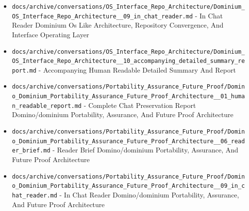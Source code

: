 \documentclass[10.5pt,a4paper,openany]{book}
\begin{document}
\begin{itemize}
\item \texttt{docs/\allowbreak{}archive/\allowbreak{}conversations/\allowbreak{}OS\_\allowbreak{}Interface\_\allowbreak{}Repo\_\allowbreak{}Architecture/\allowbreak{}Dominium\_\allowbreak{}OS\_\allowbreak{}Interface\_\allowbreak{}Repo\_\allowbreak{}Architecture\_\allowbreak{}\_\allowbreak{}09\_\allowbreak{}in\_\allowbreak{}chat\_\allowbreak{}reader.\allowbreak{}md} -\allowbreak{} In Chat Reader Dominium Os Like Architecture, Repository Convergence, And Interface Operating Layer
\item \texttt{docs/\allowbreak{}archive/\allowbreak{}conversations/\allowbreak{}OS\_\allowbreak{}Interface\_\allowbreak{}Repo\_\allowbreak{}Architecture/\allowbreak{}Dominium\_\allowbreak{}OS\_\allowbreak{}Interface\_\allowbreak{}Repo\_\allowbreak{}Architecture\_\allowbreak{}\_\allowbreak{}10\_\allowbreak{}accompanying\_\allowbreak{}detailed\_\allowbreak{}summary\_\allowbreak{}report.\allowbreak{}md} -\allowbreak{} Accompanying Human Readable Detailed Summary And Report
\item \texttt{docs/\allowbreak{}archive/\allowbreak{}conversations/\allowbreak{}Portability\_\allowbreak{}Assurance\_\allowbreak{}Future\_\allowbreak{}Proof/\allowbreak{}Domino\_\allowbreak{}Dominium\_\allowbreak{}Portability\_\allowbreak{}Assurance\_\allowbreak{}Future\_\allowbreak{}Proof\_\allowbreak{}Architecture\_\allowbreak{}\_\allowbreak{}01\_\allowbreak{}human\_\allowbreak{}readable\_\allowbreak{}report.\allowbreak{}md} -\allowbreak{} Complete Chat Preservation Report Domino/\allowbreak{}dominium Portability, Assurance, And Future Proof Architecture
\item \texttt{docs/\allowbreak{}archive/\allowbreak{}conversations/\allowbreak{}Portability\_\allowbreak{}Assurance\_\allowbreak{}Future\_\allowbreak{}Proof/\allowbreak{}Domino\_\allowbreak{}Dominium\_\allowbreak{}Portability\_\allowbreak{}Assurance\_\allowbreak{}Future\_\allowbreak{}Proof\_\allowbreak{}Architecture\_\allowbreak{}\_\allowbreak{}06\_\allowbreak{}reader\_\allowbreak{}brief.\allowbreak{}md} -\allowbreak{} Reader Brief Domino/\allowbreak{}dominium Portability, Assurance, And Future Proof Architecture
\item \texttt{docs/\allowbreak{}archive/\allowbreak{}conversations/\allowbreak{}Portability\_\allowbreak{}Assurance\_\allowbreak{}Future\_\allowbreak{}Proof/\allowbreak{}Domino\_\allowbreak{}Dominium\_\allowbreak{}Portability\_\allowbreak{}Assurance\_\allowbreak{}Future\_\allowbreak{}Proof\_\allowbreak{}Architecture\_\allowbreak{}\_\allowbreak{}09\_\allowbreak{}in\_\allowbreak{}chat\_\allowbreak{}reader.\allowbreak{}md} -\allowbreak{} In Chat Reader Domino/\allowbreak{}dominium Portability, Assurance, And Future Proof Architecture

\end{itemize}
\end{document}
